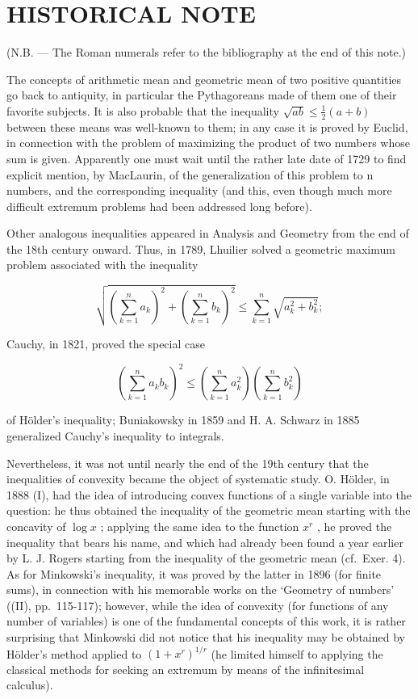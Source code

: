 \chapter*{HISTORICAL NOTE}
{}

(N.B. --- The Roman numerals refer to the bibliography at the end of this note.)

The concepts of arithmetic mean and geometric mean of two positive quantities go back to antiquity, in particular the Pythagoreans made of them one of their favorite subjects. It is also probable that the inequality \(\sqrt{ab} \leqslant \frac{1}{2}(a + b)\) between these means was well-known to them; in any case it is proved by Euclid, in connection with the problem of maximizing the product of two numbers whose sum is given. Apparently one must wait until the rather late date of 1729 to find explicit mention, by MacLaurin, of the generalization of this problem to n numbers, and the corresponding inequality (and this, even though much more difficult extremum problems had been addressed long before).

Other analogous inequalities appeared in Analysis and Geometry from the end of the 18th century onward. Thus, in 1789, Lhuilier solved a geometric maximum problem associated with the inequality

\[
\sqrt {\left(\sum_ {k = 1} ^ {n} a _ {k}\right) ^ {2} + \left(\sum_ {k = 1} ^ {n} b _ {k}\right) ^ {2}} \leqslant \sum_ {k = 1} ^ {n} \sqrt {a _ {k} ^ {2} + b _ {k} ^ {2}};
\]

Cauchy, in 1821, proved the special case

\[
\left(\sum_ {k = 1} ^ {n} a _ {k} b _ {k}\right) ^ {2} \leqslant \left(\sum_ {k = 1} ^ {n} a _ {k} ^ {2}\right) \left(\sum_ {k = 1} ^ {n} b _ {k} ^ {2}\right)
\]

of Hölder's inequality; Buniakowsky in 1859 and H. A. Schwarz in 1885 generalized Cauchy's inequality to integrals.

Nevertheless, it was not until nearly the end of the 19th century that the inequalities of convexity became the object of systematic study. O. Hölder, in 1888 (I), had the idea of introducing convex functions of a single variable into the question: he thus obtained the inequality of the geometric mean starting with the concavity of \(\log x\) ; applying the same idea to the function \(x^{r}\) , he proved the inequality that bears his name, and which had already been found a year earlier by L. J. Rogers starting from the inequality of the geometric mean (cf.~Exer. 4). As for Minkowski's inequality, it was proved by the latter in 1896 (for finite sums), in connection with his memorable works on the `Geometry of numbers' ((II), pp.~115-117); however, while the idea of convexity (for functions of any number of variables) is one of the fundamental concepts of this work, it is rather surprising that Minkowski did not notice that his inequality may be obtained by Hölder's method applied to \((1 + x^{r})^{1 / r}\) (he limited himself to applying the classical methods for seeking an extremum by means of the infinitesimal calculus).

